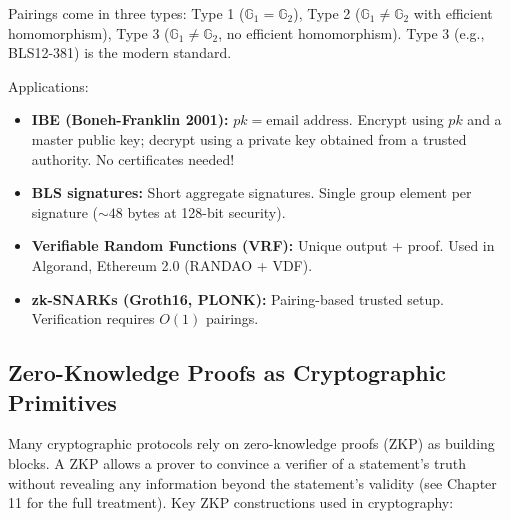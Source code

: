 Pairings come in three types: Type 1 ($\mathbb{G}_1 = \mathbb{G}_2$), Type 2 ($\mathbb{G}_1 \neq \mathbb{G}_2$ with efficient homomorphism), Type 3 ($\mathbb{G}_1 \neq \mathbb{G}_2$, no efficient homomorphism). Type 3 (e.g., BLS12-381) is the modern standard.

Applications:
\begin{itemize}
\item \textbf{IBE (Boneh-Franklin 2001):} $pk = \text{email address}$. Encrypt using $pk$ and a master public key; decrypt using a private key obtained from a trusted authority. No certificates needed!
\item \textbf{BLS signatures:} Short aggregate signatures. Single group element per signature ($\sim 48$ bytes at 128-bit security).
\item \textbf{Verifiable Random Functions (VRF):} Unique output + proof. Used in Algorand, Ethereum 2.0 (RANDAO + VDF).
\item \textbf{zk-SNARKs (Groth16, PLONK):} Pairing-based trusted setup. Verification requires $O(1)$ pairings.
\end{itemize}

\subsection{Zero-Knowledge Proofs as Cryptographic Primitives}
\label{sec:crypto:zkprimitives}

Many cryptographic protocols rely on zero-knowledge proofs (ZKP) as building blocks. A ZKP allows a prover to convince a verifier of a statement's truth without revealing any information beyond the statement's validity (see Chapter 11 for the full treatment). Key ZKP constructions used in cryptography:

